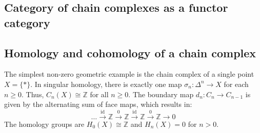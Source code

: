 






\subsection{Category of chain complexes as a functor category}










\subsection{Homology and cohomology of a chain complex}




\begin{example}
The simplest non-zero geometric example is the chain complex of a single point $X = \{*\}$. In singular homology, there is exactly one map $\sigma_n: \Delta^n \to X$ for each $n \geq 0$. Thus, $C_n(X) \cong \mathbb{Z}$ for all $n \geq 0$. The boundary map $d_n: C_n \to C_{n-1}$ is given by the alternating sum of face maps, which results in:
\[
\dots \xrightarrow{\text{id}} \mathbb{Z} \xrightarrow{0} \mathbb{Z} \xrightarrow{\text{id}} \mathbb{Z} \xrightarrow{0} \mathbb{Z} \to 0
\]
The homology groups are $H_0(X) \cong \mathbb{Z}$ and $H_n(X) = 0$ for $n > 0$.
\end{example}

